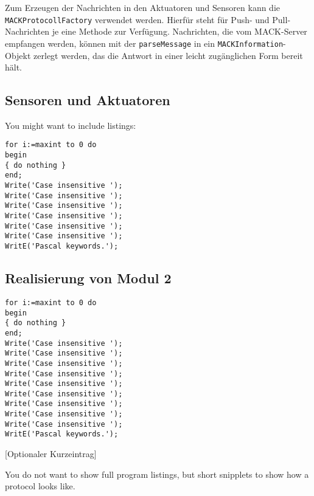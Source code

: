 Zum Erzeugen der Nachrichten in den Aktuatoren und Sensoren kann die \texttt{MACKProtocollFactory} verwendet werden. Hierfür steht für Push- und Pull-Nachrichten je eine Methode zur Verfügung. Nachrichten, die vom MACK-Server empfangen werden, können mit der \texttt{parseMessage} in ein \texttt{MACKInformation}-Objekt zerlegt werden, das die Antwort in einer leicht zugänglichen Form bereit hält.

\subsection{Sensoren und Aktuatoren}\label{subsec:real_sensors}




You might want to include listings:

\begin{illfloat}[H]
  \begin{lstlisting}
for i:=maxint to 0 do
begin
{ do nothing }
end;
Write('Case insensitive ');
Write('Case insensitive ');
Write('Case insensitive ');
Write('Case insensitive ');
Write('Case insensitive ');
Write('Case insensitive ');
WritE('Pascal keywords.');
  \end{lstlisting}%
\end{illfloat}

\subsection{Realisierung von Modul 2}\label{subsec:real_module_2}

\begin{illfloat}
  \begin{lstlisting}
for i:=maxint to 0 do
begin
{ do nothing }
end;
Write('Case insensitive ');
Write('Case insensitive ');
Write('Case insensitive ');
Write('Case insensitive ');
Write('Case insensitive ');
Write('Case insensitive ');
Write('Case insensitive ');
Write('Case insensitive ');
Write('Case insensitive ');
WritE('Pascal keywords.');
  \end{lstlisting}%
  [Optionaler Kurzeintrag]
\end{illfloat}

You do not want to show full program listings, but short snipplets to show how a protocol looks like.

